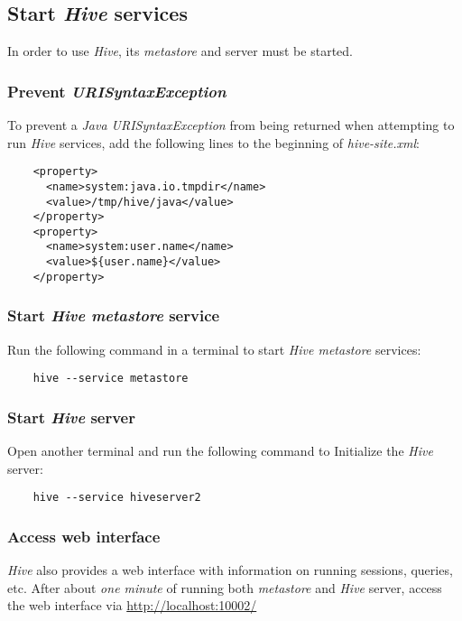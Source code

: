 \documentclass{article}
\begin{document}
  \subsection{Start \emph{Hive} services}
  \label{subsec:hiveservices}
  In order to use \emph{Hive}, its \emph{metastore} and server must be started.

    \subsubsection{Prevent \emph{URISyntaxException}}
    To prevent a \emph{Java URISyntaxException} from being returned when attempting to run \emph{Hive}
    services, add the following lines to the beginning of
    \emph{hive-site.xml}:
    \begin{verbatim}
    <property>
      <name>system:java.io.tmpdir</name>
      <value>/tmp/hive/java</value>
    </property>
    <property>
      <name>system:user.name</name>
      <value>${user.name}</value>
    </property>
    \end{verbatim}

    \subsubsection{Start \emph{Hive metastore} service}
    Run the following command in a terminal to start \emph{Hive metastore} services:
    \begin{verbatim}
    hive --service metastore
    \end{verbatim}

    \subsubsection{Start \emph{Hive} server}
    Open another terminal and run the following command to Initialize the \emph{Hive} server:
    \begin{verbatim}
    hive --service hiveserver2
    \end{verbatim}

    \subsubsection{Access web interface}
    \emph{Hive} also provides a web interface with information on running sessions, queries, etc.
    After about \emph{one minute} of running both \emph{metastore} and \emph{Hive} server, access the web
    interface via \url{http://localhost:10002/}
\end{document}
